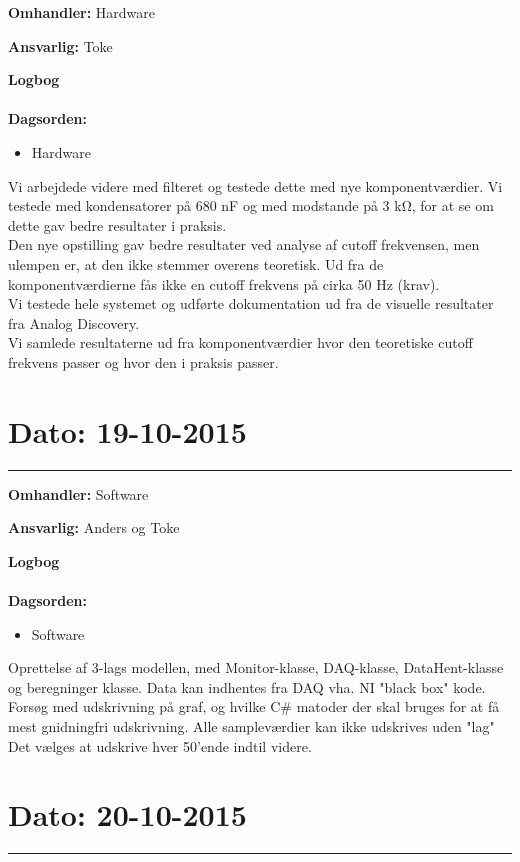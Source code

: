 \textbf{Omhandler:} Hardware

\textbf{Ansvarlig:} Toke

\textbf{Logbog}
\\
\\
\textbf{Dagsorden:}
\begin{itemize}
	\item Hardware
\end{itemize}

Vi arbejdede videre med filteret og testede dette med nye komponentværdier. Vi testede med kondensatorer på 680 nF og med modstande på 3 kΩ, for at se om dette gav bedre resultater i praksis. \\
Den nye opstilling gav bedre resultater ved analyse af cutoff frekvensen, men ulempen er, at den ikke stemmer overens teoretisk. Ud fra de komponentværdierne fås ikke en cutoff frekvens på cirka 50 Hz (krav). \\
Vi testede hele systemet og udførte dokumentation ud fra de visuelle resultater fra Analog Discovery. \\
Vi samlede resultaterne ud fra komponentværdier hvor den teoretiske cutoff frekvens passer og hvor den i praksis passer.




\section{Dato: 19-10-2015 }
\hrule

\textbf{Omhandler:} Software

\textbf{Ansvarlig:} Anders og Toke

\textbf{Logbog}
\\
\\
\textbf{Dagsorden:}
\begin{itemize}
	\item Software
\end{itemize}

Oprettelse af 3-lags modellen, med Monitor-klasse, DAQ-klasse, DataHent-klasse og beregninger klasse.
Data kan indhentes fra DAQ vha. NI "black box" kode.
Forsøg med udskrivning på graf, og hvilke C\# matoder der skal bruges for at få mest gnidningfri udskrivning.
Alle sampleværdier kan ikke udskrives uden "lag" Det vælges at udskrive hver 50'ende indtil videre.



\section{Dato: 20-10-2015 }
\hrule

